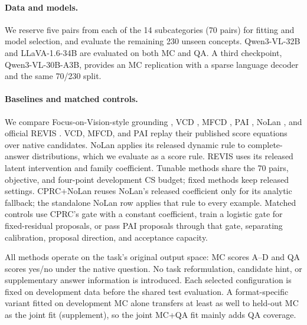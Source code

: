 \documentclass[letterpaper]{article}
\begin{document}
\paragraph{Data and models.}
We reserve five pairs from each of the 14 subcategories (70 pairs) for fitting
and model selection, and evaluate the remaining 230 unseen concepts.
Qwen3-VL-32B \cite{bai2025qwen3vl} and LLaVA-1.6-34B
\cite{liu2024llavabaselines} are evaluated on both MC and QA. A third checkpoint,
Qwen3-VL-30B-A3B, provides an MC replication with a sparse language decoder and
the same 70/230 split.

\paragraph{Baselines and matched controls.}
We compare Focus-on-Vision-style grounding \cite{liu2025insight}, VCD
\cite{leng2024vcd}, MFCD \cite{liu2025mfcd}, PAI \cite{liu2024pai}, NoLan
\cite{ren2026nolan}, and official REVIS \cite{wu2026revis}. VCD, MFCD, and PAI
replay their published score equations over native candidates. NoLan applies its
released dynamic rule to complete-answer distributions, which we evaluate as a
score rule. REVIS uses its released latent
intervention and family coefficient. Tunable methods share the 70 pairs,
objective, and four-point development CS budget; fixed methods keep released
settings. CPRC+NoLan reuses NoLan's released coefficient only for its analytic
fallback; the standalone NoLan row applies that rule to every example. Matched
controls use CPRC's gate with a constant coefficient, train a
logistic gate for fixed-residual proposals, or pass PAI proposals through that
gate, separating calibration, proposal direction, and acceptance capacity.

All methods operate on the task's original output space: MC scores A--D and QA
scores yes/no under the native question. No task reformulation, candidate hint,
or supplementary answer information is introduced. Each selected configuration
is fixed on development data before the shared test evaluation. A
format-specific variant fitted on development MC alone transfers at least as
well to held-out MC as the joint fit
(supplement), so the joint
MC+QA fit mainly adds QA coverage.
\end{document}
